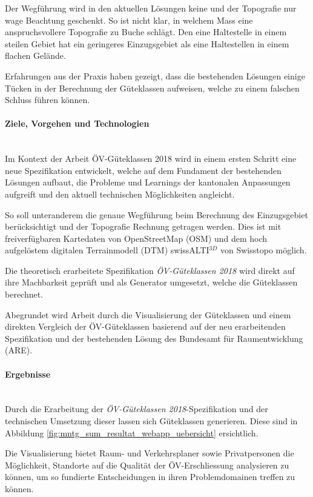 Der Wegführung wird in den aktuellen Lösungen keine und der Topografie nur wage Beachtung geschenkt.
So ist nicht klar, in welchem Mass eine anspruchsvollere Topografie zu Buche schlägt.
Den eine Haltestelle in einem steilen Gebiet hat ein geringeres Einzugsgebiet als eine Haltestellen in einem flachen Gelände.

Erfahrungen aus der Praxis haben gezeigt, dass die bestehenden Lösungen einige Tücken in der Berechnung der Güteklassen aufweisen, welche zu einem falschen Schluss führen können.

\paragraph{Ziele, Vorgehen und Technologien}~\\
Im Kontext der Arbeit ÖV-Güteklassen 2018 wird in einem ersten Schritt eine neue Spezifikation entwickelt, welche auf dem Fundament der bestehenden Lösungen aufbaut, die Probleme und Learnings der kantonalen Anpassungen aufgreift und den aktuell technischen Möglichkeiten angleicht.

So soll unteranderem die genaue Wegführung beim Berechnung des Einzugsgebiet berücksichtigt und der Topografie Rechnung getragen werden.
Dies ist mit freiverfügbaren Kartedaten von OpenStreetMap (OSM) und dem   hoch aufgelöstem digitalen Terrainmodell (DTM) swissALTI$^{3D}$ von Swisstopo möglich.

Die theoretisch erarbeitete Spezifikation \emph{ÖV-Güteklassen 2018} wird direkt auf ihre Machbarkeit geprüft und als Generator umgesetzt, welche die Güteklassen berechnet.

Abegrundet wird Arbeit durch die Visualisierung der Güteklassen und einem direkten Vergleich der ÖV-Güteklassen basierend auf der neu erarbeitenden Spezifikation  und der bestehenden Lösung des Bundesamt für Raumentwicklung (ARE).

\paragraph{Ergebnisse}~\\
Durch die Erarbeitung der \emph{ÖV-Güteklassen 2018}-Spezifikation und der technischen Umsetzung dieser lassen sich Güteklassen generieren.
Diese sind in Abbildung \ref{fig:mntg_sum_resultat_webapp_uebersicht} ersichtlich.

Die Visualisierung bietet Raum- und Verkehrsplaner sowie Privatpersonen die Möglichkeit, Standorte auf die Qualität der ÖV-Erschliessung analysieren zu können, um so fundierte Entscheidungen in ihren Problemdomainen treffen zu können.

